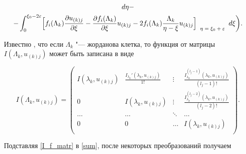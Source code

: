 \begin{multline}
  d \eta - \\

- \int _{0}^{\xi_0- 2\varepsilon}

\Bigl[

f_i(\Lambda_k) \frac{\partial u_{(k)j}}{\partial \xi} - \frac{\partial f_i(\Lambda_k)}{\partial \xi} u_{(k)j} - 2 f_i(\Lambda_k) \frac{\Lambda_k}{\eta-\xi} u_{(k)j}

\Bigr]

_{\scriptsize{

\begin{array}{l}

\eta=\xi_0+\varepsilon

 \end{array} }}

 d \xi

\biggr).

\end{multline}



Известно \cite{Lankaster}, что если $\Lambda_k$ "--- жорданова клетка, то функция от матрицы $ I(\Lambda_k,u_{(k)j})$ может быть записана в виде

\begin{equation}

 \label{I_f_matr}

 I(\Lambda_k,u_{(k)j})=

  \left(

    \begin{array}{ccccccccc}

      I(\lambda_k,u_{(k)j})& \frac{I_{\lambda_k}'(\lambda_k,u_{(k)j})}{1!} 	& \vdots & \frac{I_{\lambda_k}^{(l_j-1)}(\lambda_k,u_{(k)j})}{(l_j-1)!}\\

      0	& I(\lambda_k,u_{(k)j}) 		& \vdots & \frac{I_{\lambda_k}^{(l_j-2)}(\lambda_k,u_{(k)j})}{(l_j-2)!}\\

      \ldots		& \ldots 				& \ddots & \ldots\\

      0			& 0				& \ldots & I(\lambda_k,u_{(k)j})\\

    \end{array}

  \right).

\end{equation}



Подставляя \eqref{I_f_matr} в \eqref{sum}, после некоторых преобразований получаем

